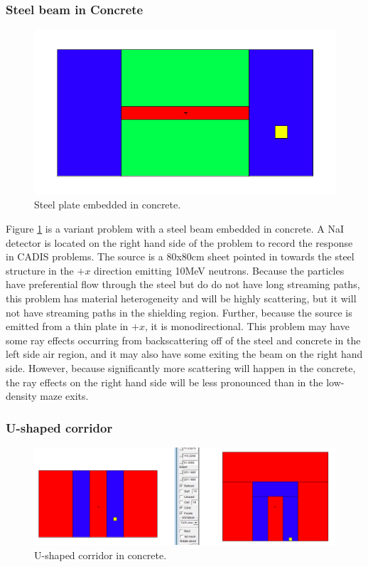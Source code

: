 \subsubsection*{Steel beam in Concrete}

\begin{figure}[h!]
  \centering
  \includegraphics[width=12cm]{./chapters/characterization_probs/figures/geometries/prob-1.png}
  \caption[Steel plate embedded in concrete.]{Steel plate embedded in concrete.}
  \label{fig:prob1geom}
\end{figure}

Figure \ref{fig:prob1geom} is a variant problem with a steel beam embedded in
concrete. A NaI detector is located on the right hand side of the problem to
record the response in CADIS problems. The source is a 80x80cm sheet pointed in
towards the steel structure in the $+x$ direction emitting 10MeV neutrons.
Because the particles have preferential flow through the steel but do do not
have long streaming paths, this problem has material heterogeneity and will be
highly scattering, but it will not have streaming paths in the shielding region.
Further, because the source is emitted from a thin plate in $+x$, it is
monodirectional. This problem may have some ray effects occurring from
backscattering off of the steel and concrete in the left side air region, and it
may also have some exiting the beam on the right hand side. However, because
significantly more scattering will happen in the concrete, the ray effects on
the right hand side will be less pronounced than in the low-density maze exits.

\subsubsection*{U-shaped corridor}

\begin{figure}[h!]
  \centering
  \includegraphics[width=15cm]{./chapters/characterization_probs/figures/geometries/prob-2.png}
  \caption[U-shaped corridor in concrete]{U-shaped corridor in concrete.}
  \label{fig:prob2geom}
\end{figure}

